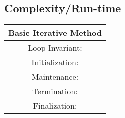 \documentclass[11pt]{article}
\begin{document}
\begin{center}
\subsection{Complexity/Run-time}
\end{center}
\br
\begin{center}
\begin{tabular}{||c||} 
 \hline
 Basic Iterative Method\\ [0.5ex] 
 \hline
 Loop Invariant: \\ 
 \hline
 Initialization: \\
 \hline
 Maintenance: \\
 \hline
 Termination: \\
 \hline
 Finalization: \\ [1ex] 
 \hline
\end{tabular}
\end{center}
\end{document}
